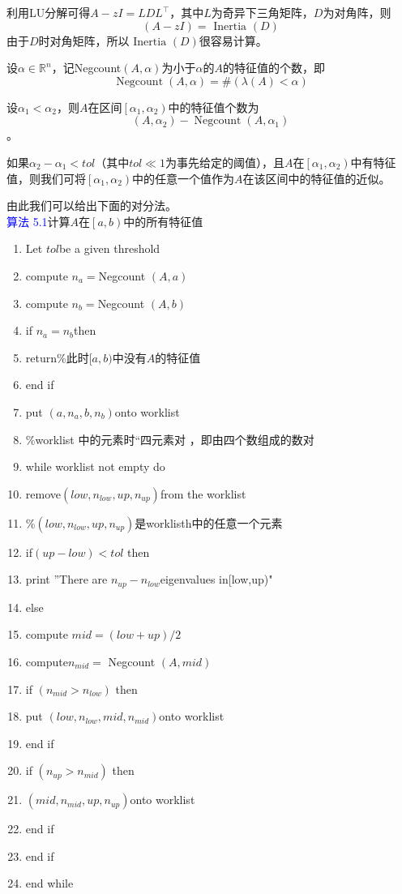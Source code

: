 \documentclass[12pt,a4paper]{article}
\begin{document}
利用LU分解可得$A-z I=L D L^{\top}$，其中$L$为奇异下三角矩阵，$D$为对角阵，则$$
(A-z I)=\text { Inertia }(D)
$$
由于$D$时对角矩阵，所以$\text { Inertia }(D)$很容易计算。

设$\alpha \in \mathbb{R}^{n}$，记Negcount$(A,\alpha)$为小于$\alpha$的$A$的特征值的个数，即$$
\operatorname{Negcount}(A, \alpha)=\#(\lambda(A)<\alpha)
$$

设$\alpha_{1}<\alpha_{2}$，则$A$在区间$\left[\alpha_{1}, \alpha_{2}\right)$中的特征值个数为$$
\left(A, \alpha_{2}\right)-\operatorname{Negcount}\left(A, \alpha_{1}\right)
$$。

如果$\alpha_{2}-\alpha_{1}<t o l$（其中$tol\ll 1$为事先给定的阈值），且$A$在$\left[\alpha_{1}, \alpha_{2}\right)$中有特征值，则我们可将$\left[\alpha_{1}, \alpha_{2}\right)$中的任意一个值作为$A$在该区间中的特征值的近似。

由此我们可以给出下面的对分法。\\
\textcolor{blue}{算法 5.1}\quad 计算$A$在$\left[a, b\right)$中的所有特征值
\begin{enumerate}[1:]
	\item Let $tol$be a given threshold
	\item compute $n_a=$Negcount $(A, a)$
	\item compute $n_b=$Negcount $(A, b)$
	\item if $n_a=n_b$then
	\item \quad return\qquad \%此时$[a,b)$中没有$A$的特征值
	\item end if
	\item put $\left(a, n_{a}, b, n_{b}\right)$onto worklist
	\item \quad \%worklist 中的元素时“四元素对
	，即由四个数组成的数对
	\item while worklist not empty do
	\item \quad remove$\left(l o w, n_{l o w}, u p, n_{u p}\right)$from the worklist
	\item \quad \%$\left(l o w, n_{l o w}, u p, n_{u p}\right)$是worklisth中的任意一个元素
	\item \quad if$(up-low)<tol$ then
	\item \qquad print ”There are $n_{up}-n_{low}$eigenvalues in[low,up)"
	\item \quad else
	\item \qquad compute $mid=(low+up)/2$
	\item \qquad compute$n_{m i d}=$ Negcount $(A, m i d)$
	\item \qquad if $\left(n_{m i d}>n_{l o w}\right)$ then
	\item \qquad \quad put $\left(l o w, n_{l o w}, m i d, n_{m i d}\right)$onto worklist
	\item \qquad end if
	\item \qquad if $\left(n_{up}>n_{mid}\right)$ then
	\item \qquad \quad $\left(m i d, n_{m i d}, u p, n_{u p}\right)$onto worklist
	\item \qquad end if
	\item \quad end if
	\item end while
\end{enumerate}
\end{document}

